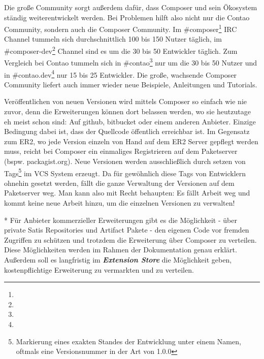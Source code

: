 \documentclass[
paper=a4,
draft=false,%
fontsize=10pt%
]{scrartcl}
\newcommand{\store}{\textbf{\textit{Extension Store}}}
\begin{document}
Die große Community sorgt außerdem dafür, dass Composer und sein Ökosystem ständig weiterentwickelt werden. Bei Problemen hilft also nicht nur die Contao Community, sondern auch die Composer Community. Im \#composer\footnote{} IRC Channel tummeln sich durchschnittlich 100 bis 150 Nutzer täglich, im \#composer-dev\footnote{} Channel sind es um die 30 bis 50 Entwickler täglich. Zum Vergleich bei Contao tummeln sich in \#contao\footnote{} nur um die 30 bis 50 Nutzer und in \#contao.dev\footnote{} nur 15 bis 25 Entwickler. Die große, wachsende Composer Community liefert auch immer wieder neue  Beispiele, Anleitungen und Tutorials.

Veröffentlichen von neuen Versionen wird mittels Composer so einfach wie nie zuvor, denn die Erweiterungen können dort belassen werden, wo sie heutzutage eh meist schon sind: Auf github, bitbucket oder einem anderen Anbieter. Einzige Bedingung dabei ist, dass der Quellcode öffentlich erreichbar ist. Im Gegensatz zum ER2, wo jede Version einzeln von Hand auf dem ER2 Server gepflegt werden muss, reicht bei Composer ein einmaliges Registrieren auf dem Paketserver (bspw. packagist.org). Neue Versionen werden ausschließlich durch setzen von Tags\footnote{Markierung eines exakten Standes der Entwicklung unter einem Namen, oftmals eine Versionsnummer in der Art von 1.0.0} im VCS System erzeugt. Da für gewöhnlich diese Tags von Entwicklern ohnehin gesetzt werden, fällt die ganze Verwaltung der Versionen auf dem Paketserver weg. Man kann also mit Recht behaupten: Es fällt Arbeit weg und kommt keine neue Arbeit hinzu, um die einzelnen Versionen zu verwalten!

\begin{info}
* Für Anbieter kommerzieller Erweiterungen gibt es die Möglichkeit - über private Satis Repositories und Artifact Pakete - den eigenen Code vor fremden Zugriffen zu schützen und trotzdem die Erweiterung über Composer zu verteilen. Diese Möglichkeiten werden im Rahmen der Dokumentation genau erklärt. Außerdem soll es langfristig im \store{} die Möglichkeit geben, kostenpflichtige Erweiterung zu vermarkten und zu verteilen.
\end{info}

\newpage

%
%
\end{document}
